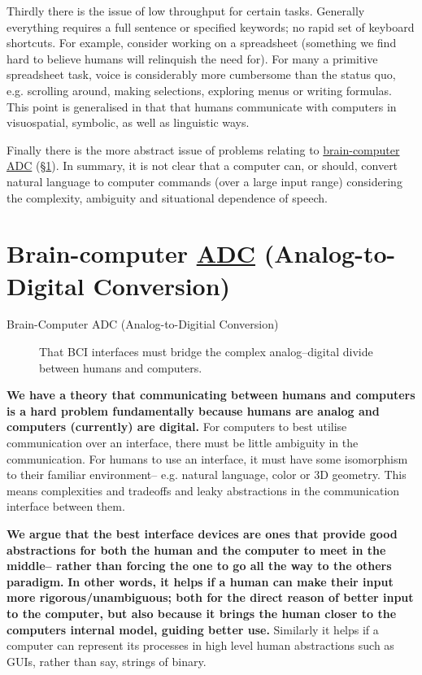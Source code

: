 \documentclass[logo,bsc,singlespacing,parskip]{infthesis}
\begin{document}
Thirdly there is the issue of low throughput for certain tasks.
Generally everything requires a full sentence or specified keywords; no rapid set of keyboard shortcuts.
For example, consider working on a spreadsheet (something we find hard to believe humans will relinquish the need for).
For many a primitive spreadsheet task, voice is considerably more cumbersome than the status quo, e.g. scrolling around, making selections, exploring menus or writing formulas.
This point is generalised in that that humans communicate with computers in visuospatial, symbolic, as well as linguistic ways.

Finally there is the more abstract issue of problems relating to \hyperref[sec:org590e6c8]{brain-computer ADC} (\S \ref{sec:org590e6c8}).
In summary, it is not clear that a computer can, or should, convert natural language to computer commands (over a large input range) considering the complexity, ambiguity and situational dependence of speech.

\section{Brain-computer \hyperref[org146c745]{ADC} (Analog-to-Digital Conversion)}
\label{sec:org590e6c8}
\medskip
\begin{mdframed}
\begin{description}
\item[{Brain-Computer \label{org146c745}ADC (Analog-to-Digitial Conversion)}] That BCI interfaces must bridge the complex analog--digital divide between humans and computers.
\end{description}
\end{mdframed}


\textbf{We have a theory that communicating between humans and computers is a hard problem fundamentally because humans are analog and computers (currently) are digital.}
For computers to best utilise communication over an interface, there must be little ambiguity in the communication.
For humans to use an interface, it must have some isomorphism to their familiar environment-- e.g. natural language, color or 3D geometry.
This means complexities and tradeoffs and leaky abstractions in the communication interface between them.

\textbf{We argue that the best interface devices are ones that provide good abstractions for both the human and the computer to meet in the middle-- rather than forcing the one to go all the way to the others paradigm.}
\textbf{In other words, it helps if a human can make their input more rigorous/unambiguous; both for the direct reason of better input to the computer, but also because it brings the human closer to the computers internal model, guiding better use.}
Similarly it helps if a computer can represent its processes in high level human abstractions such as GUIs, rather than say, strings of binary.
\end{document}
